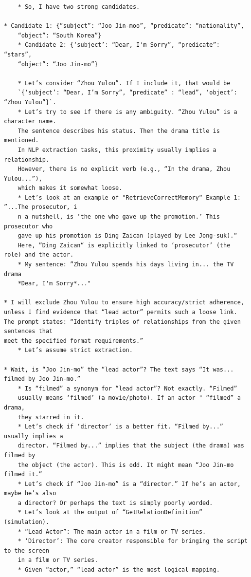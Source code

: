\begin{verbatim}
    * So, I have two strong candidates.
    
* Candidate 1: {“subject”: “Joo Jin-moo”, “predicate”: “nationality”, 
    “object”: “South Korea”}
    * Candidate 2: {‘subject’: “Dear, I'm Sorry”, “predicate”: “stars”,
    “object”: “Joo Jin-mo”}

    * Let’s consider “Zhou Yulou”. If I include it, that would be 
    `{‘subject’: “Dear, I’m Sorry”, “predicate” : “lead”, ‘object’: “Zhou Yulou”}`. 
    * Let’s try to see if there is any ambiguity. “Zhou Yulou” is a character name. 
    The sentence describes his status. Then the drama title is mentioned. 
    In NLP extraction tasks, this proximity usually implies a relationship. 
    However, there is no explicit verb (e.g., “In the drama, Zhou Yulou...”), 
    which makes it somewhat loose.
    * Let’s look at an example of "RetrieveCorrectMemory“ Example 1: ”...The prosecutor, i
    n a nutshell, is ‘the one who gave up the promotion.’ This prosecutor who 
    gave up his promotion is Ding Zaican (played by Lee Jong-suk).“ 
    Here, ”Ding Zaican“ is explicitly linked to ‘prosecutor’ (the role) and the actor.
    * My sentence: ”Zhou Yulou spends his days living in... the TV drama 
    *Dear, I'm Sorry*..."
    
* I will exclude Zhou Yulou to ensure high accuracy/strict adherence, 
unless I find evidence that “lead actor” permits such a loose link. 
The prompt states: “Identify triples of relationships from the given sentences that 
meet the specified format requirements.” 
    * Let’s assume strict extraction.
    
* Wait, is “Joo Jin-mo” the “lead actor”? The text says “It was... filmed by Joo Jin-mo.” 
    * Is “filmed” a synonym for “lead actor”? Not exactly. “Filmed” 
    usually means ‘filmed’ (a movie/photo). If an actor " “filmed” a drama, 
    they starred in it.
    * Let’s check if ‘director’ is a better fit. “Filmed by...” usually implies a 
    director. “Filmed by...” implies that the subject (the drama) was filmed by 
    the object (the actor). This is odd. It might mean “Joo Jin-mo filmed it.”
    * Let’s check if “Joo Jin-mo” is a “director.” If he’s an actor, maybe he’s also 
    a director? Or perhaps the text is simply poorly worded.
    * Let’s look at the output of “GetRelationDefinition” (simulation).
    * “Lead Actor”: The main actor in a film or TV series.
    * ‘Director’: The core creator responsible for bringing the script to the screen 
    in a film or TV series.
    * Given “actor,” “lead actor” is the most logical mapping.


\end{verbatim}
